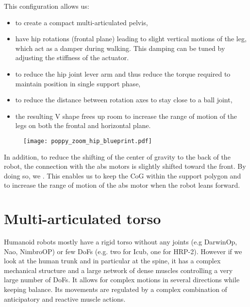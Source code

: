 This configuration allows us:

\begin{itemize}
    \item to create a compact multi-articulated pelvis,
    \item have hip rotations (frontal plane) leading to slight vertical motions of the leg, which act as a damper during walking. This damping can be tuned by adjusting the stiffness of the actuator.
    \item to reduce the hip joint lever arm and thus reduce the torque required to maintain position in single support phase,
    \item to reduce the distance between rotation axes to stay close to a ball joint,
    \item the resulting V shape frees up room to increase the range of motion of the legs on both the frontal and horizontal plane.
\end{itemize}

\begin{figure}[p]
    \begin{center}
        \texttt{[image: poppy\_zoom\_hip\_blueprint.pdf]}
    \end{center}
    \caption{}
    \label{fig:poppy_zoom_hip_blueprint}
\end{figure}

In addition, to reduce the shifting of the center of gravity to the back of the robot, the connection with the abs motors is slightly shifted toward the front. By doing so, we .
This enables us to keep the CoG within the support polygon and to increase the range of motion of the abs motor when the robot leans forward.


\section{Multi-articulated torso} %

Humanoid robots mostly have a rigid torso without any joints (e.g DarwinOp, Nao, NimbroOP) or few DoFs (e.g. two for Icub, one for HRP-2). However if we look at the human trunk and in particular at the spine, it has a complex mechanical structure and a large network of dense muscles controlling a very large number of DoFs. It allows for complex motions in several directions while keeping balance. Its movements are regulated by a complex combination of anticipatory and reactive muscle actions.

